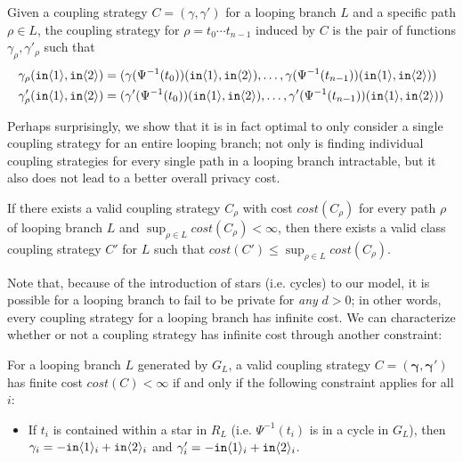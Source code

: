 \begin{defn}\label{svInducedCouplingStrategy}
    Given a coupling strategy $C = (\gamma, \gamma')$ for a looping branch $L$ and a specific path $\rho\in L$, the coupling strategy for $\rho=t_0\cdots t_{n-1}$ induced by $C$ is the pair of functions $\gamma_\rho, \gamma'_\rho$ such that 
    \begin{align*}
        \gamma_\rho(\texttt{in}\langle1 \rangle, \texttt{in}\langle2 \rangle) &= (\gamma(\Psi^{-1}(t_0))(\texttt{in}\langle1 \rangle, \texttt{in}\langle2 \rangle), \ldots,\gamma(\Psi^{-1}(t_{n-1}))(\texttt{in}\langle1 \rangle, \texttt{in}\langle2 \rangle) )\\
        \gamma'_\rho(\texttt{in}\langle1 \rangle, \texttt{in}\langle2 \rangle) &= (\gamma'(\Psi^{-1}(t_0))(\texttt{in}\langle1 \rangle, \texttt{in}\langle2 \rangle),\ldots,\gamma'(\Psi^{-1}(t_{n-1}))(\texttt{in}\langle1 \rangle, \texttt{in}\langle2 \rangle) )
    \end{align*}
\end{defn}

Perhaps surprisingly, we show that it is in fact optimal to only consider a single coupling strategy for an entire looping branch; not only is finding individual coupling strategies for every single path in a looping branch intractable, but it also does not lead to a better overall privacy cost. 

\begin{prop}\label{ClassCouplingStrategiesAreEnoughProp}
    If there exists a valid coupling strategy $C_\rho$ with cost $cost(C_\rho)$ for every path $\rho$ of looping branch $L$ and $\sup_{\rho\in L}cost(C_\rho)< \infty$, then there exists a valid class coupling strategy $C'$ for $L$ such that $cost(C') \leq \sup_{\rho\in L}cost(C_\rho)$. 
\end{prop}

Note that, because of the introduction of stars (i.e. cycles) to our model, it is possible for a looping branch to fail to be private for \textit{any} $d>0$; in other words, every coupling strategy for a looping branch has infinite cost. We can characterize whether or not a coupling strategy has infinite cost through another constraint:

\begin{lemma}\label{finiteCostConstraintLemma}
    For a looping branch $L$ generated by $G_L$, a valid coupling strategy $C = (\mathbf{\gamma}, \mathbf{\gamma}')$ has finite cost $cost(C)<\infty$ if and only if the following constraint applies for all $i$:
    \begin{itemize}
        \item If $t_i$ is contained within a star in $R_L$ (i.e. $\Psi^{-1}(t_i)$ is in a cycle in $G_L$), then $\gamma_i = -\texttt{in}\langle1 \rangle_i+\texttt{in}\langle2 \rangle_i$ and $\gamma_i' = -\texttt{in}\langle1 \rangle_i+\texttt{in}\langle2 \rangle_i$.
    \end{itemize}
\end{lemma}

